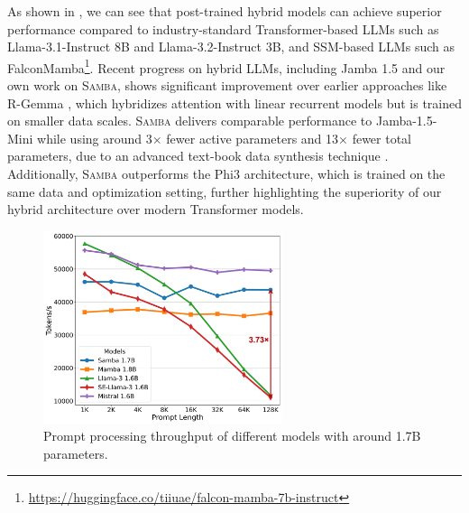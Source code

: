 \documentclass{article}
\begin{document}
As shown in , we can see that post-trained hybrid models can achieve superior performance compared to industry-standard Transformer-based LLMs such as Llama-3.1-Instruct 8B and Llama-3.2-Instruct 3B, and SSM-based LLMs such as FalconMamba\footnote{\url{https://huggingface.co/tiiuae/falcon-mamba-7b-instruct}}. Recent progress on hybrid LLMs, including Jamba 1.5 \citep{team2024jamba15} and our own work on \textsc{Samba}, shows significant improvement over earlier approaches like R-Gemma \citep{botev2024recurrentgemma}, which hybridizes attention with linear recurrent models but is trained on smaller data scales. \textsc{Samba}  delivers comparable performance to Jamba-1.5-Mini while using around 3$\times$ fewer active parameters and 13$\times$ fewer total parameters, due to an advanced text-book data synthesis technique \citep{abdin2024phi3}. Additionally, \textsc{Samba} outperforms the Phi3 architecture, which is trained on the same data and optimization setting, further highlighting the superiority of our hybrid architecture over modern Transformer models.



\begin{figure}[!ht]
    \centering
    \includegraphics[width=7cm]{speed.jpg}
    \caption{Prompt processing throughput of different models with around 1.7B parameters.}
    \label{fig:prefill}
\end{figure}



\end{document}
